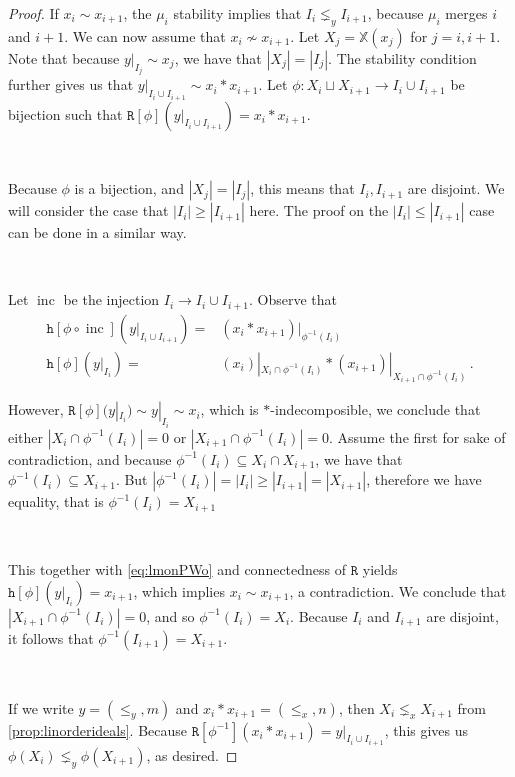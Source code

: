 \documentclass[12pt, reqno]{amsart}
\theoremstyle{definition}
\DeclareMathOperator{\inc}{\mathrm{inc}}
\begin{document}
\begin{proof}
If $x_i \sim x_{i+1}$, the $\mu_i$ stability implies that $I_i \lneq_y I_{i+1}$, because $\mu_i$ merges $i$ and $i+1$.
We can now assume that $x_i \not\sim x_{i+1}$.
Let $X_j = \mathbb{X}(x_j)$ for $j = i, i+1$.
Note that because $y|_{I_j} \sim x_j$, we have that $|X_j| = |I_j|$.
The stability condition further gives us that $y|_{I_i \cup I_{i+1}} \sim x_i \ast x_{i+1}$.
Let $\phi : X_i \sqcup X_{i+1} \to  I_i \cup I_{i+1}$ be bijection such that $\mathtt{R}[\phi](y|_{ I_i \cup I_{i+1}}) = x_i \ast x_{i+1}$.

\

Because $\phi$ is a bijection, and $|X_j| = |I_j|$, this means that $I_i, I_{i+1}$ are disjoint.
We will consider the case that $|I_i| \geq |I_{i+1}|$ here.
The proof on the $|I_i| \leq |I_{i+1}|$ case can be done in a similar way.

\

Let $\inc $ be the injection $I_i \to I_i \cup I_{i+1}$.
Observe that
\begin{equation}\label{eq:lmonPWo}
    \begin{split}
        \mathtt{h}[\phi \circ \inc](y|_{I_i \cup I_{i+1}}) =& (x_i \ast x_{i+1})|_{\phi^{-1}(I_i)}\\
        \mathtt{h}[\phi](y|_{I_i}) =& (x_i)|_{X_i \cap \phi^{-1}(I_i)} \ast (x_{i+1})|_{X_{i+1} \cap \phi^{-1}(I_i)}\, .
    \end{split}
\end{equation}

However, $\mathtt{R}[\phi](y|_{I_i}) \sim y|_{I_i} \sim x_i$, which is $\ast$-indecomposible, we conclude that either $|X_i \cap \phi^{-1}(I_i)| = 0 $ or $|X_{i+1} \cap \phi^{-1}(I_i)| = 0$.
Assume the first for sake of contradiction, and because $\phi^{-1}(I_i) \subseteq X_i \cap X_{i+1}$, we have that $\phi^{-1}(I_i) \subseteq X_{i+1}$.
But $|\phi^{-1}(I_i)| = |I_i| \geq |I_{i+1}| = |X_{i+1}|$, therefore we have equality, that is $\phi^{-1}(I_i) = X_{i+1}$

\

This together with \eqref{eq:lmonPWo} and connectedness of $\mathtt{R}$ yields $\mathtt{h}[\phi](y|_{I_i}) = x_{i+1}$, which implies $x_i \sim x_{i+1}$, a contradiction.
We conclude that $|X_{i+1} \cap \phi^{-1}(I_i)| = 0$, and so $\phi^{-1}(I_i) = X_i$.
Because $I_i$ and $I_{i+1}$ are disjoint, it follows that $\phi^{-1}(I_{i+1}) = X_{i+1}$.

\

If we write $y = (\leq_y, m)$ and $x_i \ast x_{i+1} = (\leq_x, n)$, then $X_i \lneq_x X_{i+1}$ from \cref{prop:linorderideals}.
Because $\mathtt{R}[\phi^{-1}](x_i \ast x_{i+1}) = y|_{I_i \cup I_{i+1}}$, this gives us $\phi(X_i) \lneq_y \phi(X_{i+1})$, as desired.
\end{proof}
\end{document}
